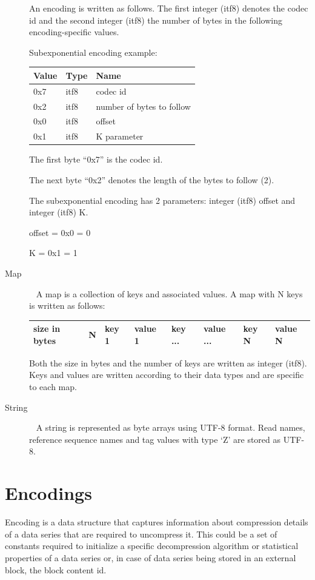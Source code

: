 \documentclass[a4paper]{article}
\begin{document}
\begin{description}
An encoding is written as follows. The first integer (itf8) denotes the codec id 
and the second integer (itf8) the number of bytes in the following encoding-specific 
values. 

Subexponential encoding example: 

\begin{tabular}{|l|l|l|}
\hline
\textbf{Value} & \textbf{Type} & \textbf{Name}\tabularnewline
\hline
0x7 & itf8 & codec id\tabularnewline
\hline
0x2 & itf8 & number of bytes to follow\tabularnewline
\hline
0x0 & itf8 & offset\tabularnewline
\hline
0x1 & itf8 & K parameter\tabularnewline
\hline
\end{tabular}

The first byte ``0x7'' is the codec id. 

The next byte ``0x2'' denotes the length of the bytes to follow (2). 

The subexponential encoding has 2 parameters: integer (itf8) offset and integer (itf8) K.

offset = 0x0 = 0

K = 0x1 = 1


\item[{Map}]\ \newline
A map is a collection of keys and associated values. A map with N keys is written 
as follows: 

\begin{tabular}{|l|l|l|l|l|l|l|l|}
\hline
size in bytes & N & key 1 & value 1 & key ... & value ... & key N & value N\tabularnewline
\hline
\end{tabular}

Both the size in bytes and the number of keys are written as integer (itf8). Keys 
and values are written according to their data types and are specific to each map.

\item[String]\ \newline
A string is represented as byte arrays using UTF-8 format. Read names, reference 
sequence names and tag values with type `Z' are stored as UTF-8.

\end{description}


\section{\textbf{Encodings }}

Encoding is a data structure that captures information about compression details 
of a data series that are required to uncompress it. This could be a set of constants 
required to initialize a specific decompression algorithm or statistical properties 
of a data series or, in case of data series being stored in an external block, 
the block content id. 
\end{document}
